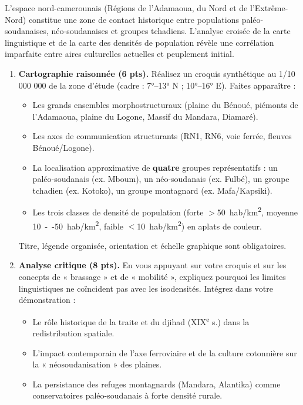 \documentclass[11pt]{article}
\begin{document}
\begin{exercice}
L'espace nord-camerounais (Régions de l'Adamaoua, du Nord et de l'Extrême-Nord) constitue une zone de contact historique entre populations paléo-soudanaises, néo-soudanaises et groupes tchadiens. L'analyse croisée de la carte linguistique et de la carte des densités de population révèle une corrélation imparfaite entre aires culturelles actuelles et peuplement initial.

\begin{enumerate}
    \item \textbf{Cartographie raisonnée (6 pts).} Réalisez un croquis synthétique au 1/10 000 000 de la zone d'étude (cadre : 7°–13° N ; 10°–16° E). Faites apparaître : 
    \begin{itemize}
        \item Les grands ensembles morphostructuraux (plaine du Bénoué, piémonts de l'Adamaoua, plaine du Logone, Massif du Mandara, Diamaré).
        \item Les axes de communication structurants (RN1, RN6, voie ferrée, fleuves Bénoué/Logone).
        \item La localisation approximative de \textbf{quatre} groupes représentatifs : un paléo-soudanais (ex. Mboum), un néo-soudanais (ex. Fulbé), un groupe tchadien (ex. Kotoko), un groupe montagnard (ex. Mafa/Kapsiki).
        \item Les trois classes de densité de population (forte $>$\SI{50}{hab/km^2}, moyenne \SI{10}{--}\SI{50}{hab/km^2}, faible $<$\SI{10}{hab/km^2}) en aplats de couleur.
    \end{itemize}
    Titre, légende organisée, orientation et échelle graphique sont obligatoires.

    \item \textbf{Analyse critique (8 pts).} En vous appuyant sur votre croquis et sur les concepts de « brassage » et de « mobilité », expliquez pourquoi les limites linguistiques ne coïncident pas avec les isodensités. Intégrez dans votre démonstration : 
    \begin{itemize}
        \item Le rôle historique de la traite et du djihad (XIX\textsuperscript{e} s.) dans la redistribution spatiale.
        \item L'impact contemporain de l'axe ferroviaire et de la culture cotonnière sur la « néosoudanisation » des plaines.
        \item La persistance des refuges montagnards (Mandara, Alantika) comme conservatoires paléo-soudanais à forte densité rurale.
    \end{itemize}


\end{enumerate}
\end{exercice}
\end{document}
